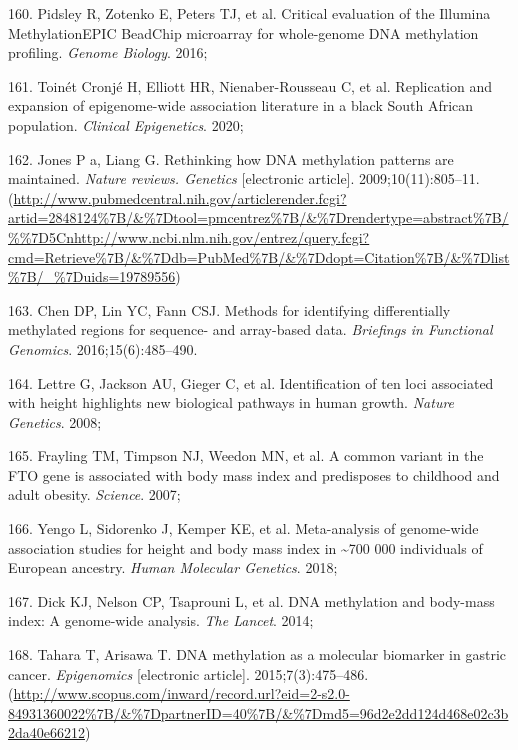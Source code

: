 \documentclass[11pt,oneside]{bristolthesis}
\newenvironment{cslreferences}%
  {}%
  {\par}
\begin{document}
\begin{cslreferences}
\leavevmode\hypertarget{ref-Pidsley2016}{}%
160. Pidsley R, Zotenko E, Peters TJ, et al. Critical evaluation of the Illumina MethylationEPIC BeadChip microarray for whole-genome DNA methylation profiling. \emph{Genome Biology}. 2016;

\leavevmode\hypertarget{ref-ToinetCronje2020}{}%
161. Toinét Cronjé H, Elliott HR, Nienaber-Rousseau C, et al. Replication and expansion of epigenome-wide association literature in a black South African population. \emph{Clinical Epigenetics}. 2020;

\leavevmode\hypertarget{ref-Jones2009}{}%
162. Jones P a, Liang G. Rethinking how DNA methylation patterns are maintained. \emph{Nature reviews. Genetics} {[}electronic article{]}. 2009;10(11):805--11. (\url{http://www.pubmedcentral.nih.gov/articlerender.fcgi?artid=2848124\%7B/\&\%7Dtool=pmcentrez\%7B/\&\%7Drendertype=abstract\%7B/\%\%7D5Cnhttp://www.ncbi.nlm.nih.gov/entrez/query.fcgi?cmd=Retrieve\%7B/\&\%7Ddb=PubMed\%7B/\&\%7Ddopt=Citation\%7B/\&\%7Dlist\%7B/_\%7Duids=19789556})

\leavevmode\hypertarget{ref-Chen2016}{}%
163. Chen DP, Lin YC, Fann CSJ. Methods for identifying differentially methylated regions for sequence- and array-based data. \emph{Briefings in Functional Genomics}. 2016;15(6):485--490.

\leavevmode\hypertarget{ref-Lettre2008}{}%
164. Lettre G, Jackson AU, Gieger C, et al. Identification of ten loci associated with height highlights new biological pathways in human growth. \emph{Nature Genetics}. 2008;

\leavevmode\hypertarget{ref-Frayling2007}{}%
165. Frayling TM, Timpson NJ, Weedon MN, et al. A common variant in the FTO gene is associated with body mass index and predisposes to childhood and adult obesity. \emph{Science}. 2007;

\leavevmode\hypertarget{ref-Yengo2018}{}%
166. Yengo L, Sidorenko J, Kemper KE, et al. Meta-analysis of genome-wide association studies for height and body mass index in \textasciitilde700 000 individuals of European ancestry. \emph{Human Molecular Genetics}. 2018;

\leavevmode\hypertarget{ref-Dick2014}{}%
167. Dick KJ, Nelson CP, Tsaprouni L, et al. DNA methylation and body-mass index: A genome-wide analysis. \emph{The Lancet}. 2014;

\leavevmode\hypertarget{ref-Tahara2015}{}%
168. Tahara T, Arisawa T. DNA methylation as a molecular biomarker in gastric cancer. \emph{Epigenomics} {[}electronic article{]}. 2015;7(3):475--486. (\url{http://www.scopus.com/inward/record.url?eid=2-s2.0-84931360022\%7B/\&\%7DpartnerID=40\%7B/\&\%7Dmd5=96d2e2dd124d468e02c3b2da40e66212})


\end{cslreferences}
\end{document}
